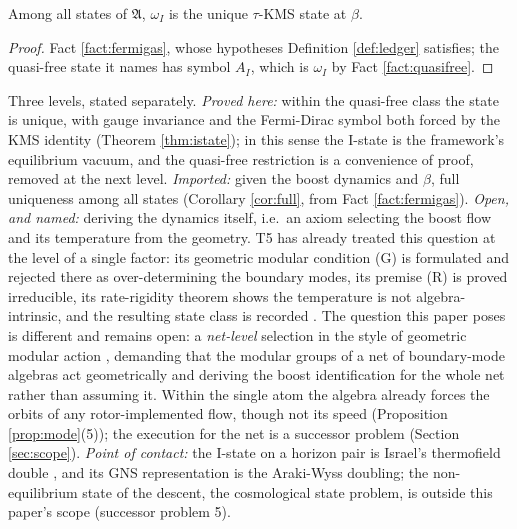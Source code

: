 \begin{corollary}\label{cor:full}
Among all states of $\mathfrak{A}$, $\omega_I$ is the unique $\tau$-KMS state at $\beta$.
\end{corollary}

\begin{proof}
Fact \ref{fact:fermigas}, whose hypotheses Definition \ref{def:ledger} satisfies; the quasi-free state it names has symbol $A_I$, which is $\omega_I$ by Fact \ref{fact:quasifree}.
\end{proof}

\begin{remark}\label{rem:frontier}
Three levels, stated separately. \emph{Proved here:} within the quasi-free class the state is unique, with gauge invariance and the Fermi-Dirac symbol both forced by the KMS identity (Theorem \ref{thm:istate}); in this sense the I-state is the framework's equilibrium vacuum, and the quasi-free restriction is a convenience of proof, removed at the next level. \emph{Imported:} given the boost dynamics and $\beta$, full uniqueness among all states (Corollary \ref{cor:full}, from Fact \ref{fact:fermigas}). \emph{Open, and named:} deriving the dynamics itself, i.e.\ an axiom selecting the boost flow and its temperature from the geometry. T5 has already treated this question at the level of a single factor: its geometric modular condition (G) is formulated and rejected there as over-determining the boundary modes, its premise (R) is proved irreducible, its rate-rigidity theorem shows the temperature is not algebra-intrinsic, and the resulting state class is recorded \cite[Def.~7.12, Thms.~7.16 and 7.28, Cor.~7.32]{ButlerT5}. The question this paper poses is different and remains open: a \emph{net-level} selection in the style of geometric modular action \cite{BDFS2000}, demanding that the modular groups of a net of boundary-mode algebras act geometrically and deriving the boost identification for the whole net rather than assuming it. Within the single atom the algebra already forces the orbits of any rotor-implemented flow, though not its speed (Proposition \ref{prop:mode}(5)); the execution for the net is a successor problem (Section \ref{sec:scope}). \emph{Point of contact:} the I-state on a horizon pair is Israel's thermofield double \cite{Israel1976}, and its GNS representation is the Araki-Wyss doubling; the non-equilibrium state of the descent, the cosmological state problem, is outside this paper's scope (successor problem 5).
\end{remark}

